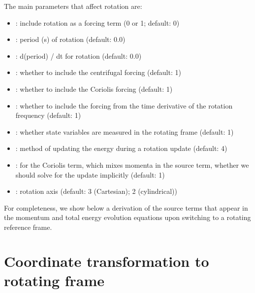 The main parameters that affect rotation are:
\begin{itemize}

\item {} : include rotation as a forcing
  term (0 or 1; default: 0)

\item {} : period (s) of rotation
  (default: 0.0)

\item {} : d(period) / dt for rotation
  (default: 0.0)

\item {} : whether to
  include the centrifugal forcing (default: 1)

\item {} : whether to
  include the Coriolis forcing (default: 1)

\item {} : whether to
  include the forcing from the time derivative of the rotation
  frequency (default: 1)

\item {} : whether state
  variables are measured in the rotating frame (default: 1)

\item {} : method of updating the
  energy during a rotation update (default: 4)

\item {} : for the Coriolis
  term, which mixes momenta in the source term, whether we should
  solve for the update implicitly (default: 1)

\item {} : rotation axis (default: 3
  (Cartesian); 2 (cylindrical))

\end{itemize}

For completeness, we show below a derivation of the source terms that
appear in the momentum and total energy evolution equations upon
switching to a rotating reference frame.


\section{Coordinate transformation to rotating frame}

